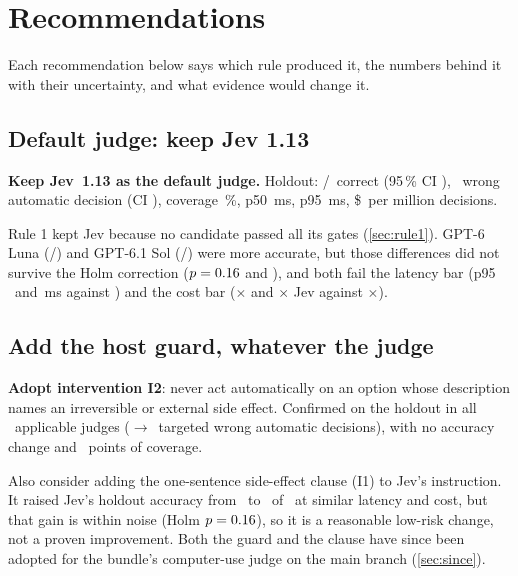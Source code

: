 \section{Recommendations}\label{sec:recs}

Each recommendation below says which rule produced it, the numbers behind it with their uncertainty,
and what evidence would change it.

\subsection{Default judge: keep Jev 1.13 \texorpdfstring{\prereg}{[preregistered]}}

\begin{keyidea}
\textbf{Keep Jev~1.13 as the default judge.} Holdout: \JevHoldAccK/\HoldN\ correct (95\,\% CI
\JevHoldAccCI), \JevHoldWaK\ wrong automatic decision (CI \JevHoldWaCI), coverage \JevHoldCovPct\,\%,
p50 \JevHoldPfifty\,ms, p95 \JevHoldPninetyfive\,ms, \$\JevHoldCost\ per million decisions.
\end{keyidea}

Rule 1 kept Jev because no candidate passed all its gates (\cref{sec:rule1}). GPT-6 Luna
(\LunaHoldAccK/\HoldN) and GPT-6.1 Sol (\SolHoldAccK/\HoldN) were more accurate, but those differences did
not survive the Holm correction ($p = 0.16$ and \SolHoldRAccPHolm), and both fail the
latency bar (p95 \LunaHoldPninetyfive\ and \SolHoldPninetyfive\,ms against \RuleOneMaxPninetyfive) and the
cost bar (\LunaHoldCostX$\times$ and \SolHoldCostX$\times$ Jev against \RuleOneCostX$\times$).

\subsection{Add the host guard, whatever the judge \texorpdfstring{\prereg}{[preregistered]}}

\begin{keyidea}
\textbf{Adopt intervention I2}: never act automatically on an option whose description names an
irreversible or external side effect. Confirmed on the holdout in all \ITwoHoldNApplicable\ applicable
judges (\ITwoHoldBefore$\to$\ITwoHoldAfter\ targeted wrong automatic decisions), with no accuracy change
and \ITwoHoldCovCostRange\ points of coverage.
\end{keyidea}

Also consider adding the one-sentence side-effect clause (I1) to Jev's instruction. It raised Jev's
holdout accuracy from \JevHoldAccK\ to \JevClHoldAccK\ of \HoldN\ at similar latency and cost, but that
gain is within noise (Holm $p = 0.16$), so it is a reasonable low-risk change, not a
proven improvement. Both the guard and the clause have since been adopted for the bundle's
computer-use judge on the main branch (\cref{sec:since}).

